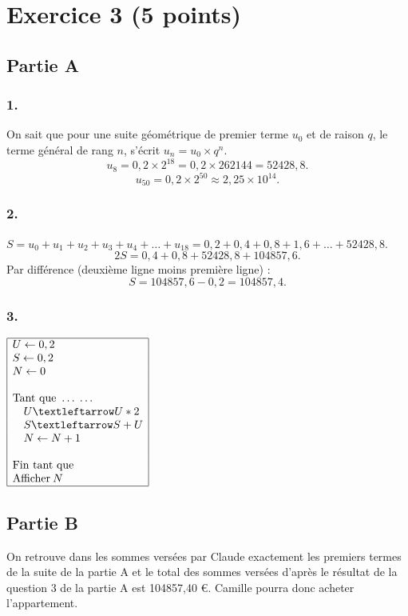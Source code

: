 \section*{Exercice 3 (5 points)}
	
	\subsection*{Partie A}
	\subsubsection*{1.}
	On sait que pour une suite géométrique de premier terme $u_0$ et de raison $q$, le terme général de rang $n$, s’écrit $u_n = u_0 \times q^n$.
	\[
	u_8 = 0,2 \times 2^{18} = 0,2 \times 262144 = 52428,8.
	\]
	\[
	u_{50} = 0,2 \times 2^{50} \approx 2,25 \times 10^{14}.
	\]
	
	\subsubsection*{2.}
	$S = u_0 + u_1 + u_2 + u_3 + u_4 + \ldots + u_{18} = 0,2 + 0,4 + 0,8 + 1,6 + \ldots + 52428,8$.
	\[
	2S = 0,4 + 0,8 + 52428,8 + 104857,6.
	\]
	Par différence (deuxième ligne moins première ligne) :
	\[
	S = 104857,6 - 0,2 = 104857,4.
	\]
	
	\subsubsection*{3.}
\begin{center}
	$\begin{array}{|l|}\hline
		U \gets  0,2\\
		S \gets 0,2\\
		N \gets 0\\
		~\\
		\text{Tant que }\ldots\;\ldots\\
		\quad U ← U * 2\\
		\quad S ← S + U\\
		\quad N \gets N + 1\\
		~\\
		\text{Fin tant que}~~~~~~~\\
		\text{Afficher}\: N\\ \hline
	\end{array}$
\end{center}

	
		

	
	\subsection*{Partie B}

	On retrouve dans les sommes versées par Claude exactement les premiers termes de la suite de la partie A et le total des sommes versées d’après le résultat de la question 3 de la partie A est 104857,40 €. Camille pourra donc acheter l’appartement.
